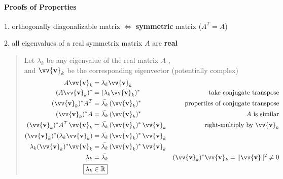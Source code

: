 \documentclass[11pt]{article}
\DeclareRobustCommand{\myvec}[1]{\vv{\mathbf{#1}}}
\newcommand{\mymat}[1]{#1}
\begin{document}
    \paragraph{Proofs of Properties}
    \noindent
    \begin{minipage}{\textwidth}
        1. orthogonally diagonalizable matrix $\iff$ \textbf{symmetric} matrix ($\mymat{A}^T = \mymat{A}$)
        \begin{quote}
            
        \end{quote}
    \end{minipage} 
    \vspace{2ex}

    \begin{minipage}{\textwidth}
        2. all eigenvalues of a real symmetrix matrix $\mymat{A}$ are \textbf{real}
        \begin{quote}
            Let $\lambda_k$ be any eigenvalue of the real matrix $\mymat{A}$ , \\ 
            and $\myvec{v}_k$ be the corresponding eigenvector (potentially complex)
            \begin{align*}
                \mymat{A}\myvec{v}_k &= \lambda_k\myvec{v}_k \\
                (\mymat{A}\myvec{v}_k)^{*} &= (\lambda_k\myvec{v}_k)^{*} & \text{take conjugate transpose} \\
                (\myvec{v}_k)^{*} \mymat{A}^T &= \bar{\lambda_k}\,(\myvec{v}_k)^{*} & \text{properties of conjugate transpose} \\
                (\myvec{v}_k)^{*} \mymat{A} &= \bar{\lambda_k}\,(\myvec{v}_k)^{*} & \text{$\mymat{A}$ is similar} \\
                (\myvec{v}_k)^{*} \mymat{A}^T\,\myvec{v}_k &= \bar{\lambda_k}\,(\myvec{v}_k)^{*}\,\myvec{v}_k & \text{right-multiply by }\myvec{v}_k \\
                (\myvec{v}_k)^{*} (\lambda_k \myvec{v}_k) &= \bar{\lambda_k}\,(\myvec{v}_k)^{*}\,\myvec{v}_k & \\
                \lambda_k (\myvec{v}_k)^{*} \myvec{v}_k &= \bar{\lambda_k}\,(\myvec{v}_k)^{*}\,\myvec{v}_k & \\
                \lambda_k &= \bar{\lambda_k} & (\myvec{v}_k)^{*}\myvec{v}_k = \|\myvec{v}\|^2 \ne 0 \\
                \Aboxed{\lambda_k &\in \mathbb{R}}
            \end{align*}
        \end{quote}    
    \end{minipage} 
    \vspace{2ex}
\end{document}
